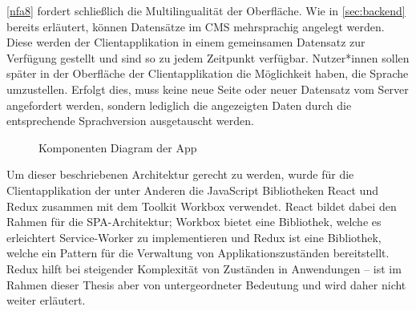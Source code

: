 \ref{nfa8} fordert schließlich die Multilingualität der Oberfläche. Wie in \autoref{sec:backend} 
bereits erläutert, können Datensätze im CMS mehrsprachig angelegt werden. Diese werden der Clientapplikation
in einem gemeinsamen Datensatz zur Verfügung gestellt und sind so zu jedem Zeitpunkt verfügbar. 
Nutzer*innen sollen später in der Oberfläche der Clientapplikation die Möglichkeit haben, die Sprache
umzustellen. Erfolgt dies, muss keine neue Seite oder neuer Datensatz vom Server angefordert werden, sondern lediglich
die angezeigten Daten durch die entsprechende Sprachversion ausgetauscht werden. \\

\begin{figure}
    \centering
    
    \caption{Komponenten Diagram der \shst{} App}
    \label{fig:ss-app-class-diagram}
\end{figure}

Um dieser beschriebenen Architektur gerecht zu werden, wurde für die Clientapplikation der \shst{} 
unter Anderen die JavaScript Bibliotheken React \cite{react} und Redux \cite{redux} zusammen mit dem 
Toolkit Workbox \cite{workbox} verwendet. React bildet dabei
den Rahmen für die SPA-Architektur; Workbox bietet eine Bibliothek, welche es erleichtert 
Service-Worker zu implementieren und Redux ist eine Bibliothek, welche ein Pattern für die Verwaltung 
von Applikationszuständen bereitstellt. Redux hilft bei steigender Komplexität von 
Zuständen in Anwendungen -- ist im Rahmen dieser Thesis aber von untergeordneter Bedeutung und wird daher
nicht weiter erläutert.\\


